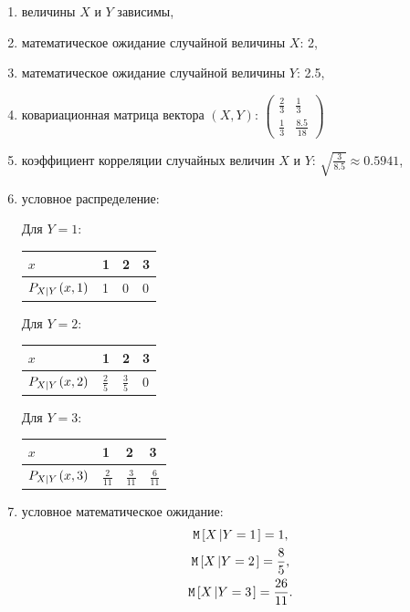 \begin{enumerate}
    \item величины $X$ и $Y$ зависимы,
    \item математическое ожидание случайной величины $X$: 2,
    \item математическое ожидание случайной величины $Y$: 2.5,
    \item ковариационная матрица вектора $\left ( X, Y \right )$:
    $
    \begin{pmatrix}
        \frac{2}{3} & \frac{1}{3}    \\
        \frac{1}{3} & \frac{8.5}{18}
    \end{pmatrix}
    $

    \item коэффициент корреляции случайных величин $X$ и $Y$: $\sqrt{\frac{3}{8.5}} \approx 0.5941$,
    \item условное распределение:

    Для $Y=1$:

    \begin{tabular}{|p{3cm}|p{1cm}|p{1cm}|p{1cm}|}
        \hline
        $x$                          & 1 & 2 & 3 \\
        \hline
        $P_{X \left | Y \right .}(x, 1)$ & 1 & 0 & 0 \\
        \hline
    \end{tabular}

    Для $Y=2$:

    \begin{tabular}{|p{3cm}|p{1cm}|p{1cm}|p{1cm}|}
        \hline
        $x$                          & 1             & 2             & 3 \\
        \hline
        $P_{X \left | Y \right .}(x, 2)$ & $\frac{2}{5}$ & $\frac{3}{5}$ & 0 \\
        \hline
    \end{tabular}

    Для $Y=3$:

    \begin{tabular}{|p{3cm}|p{1cm}|p{1cm}|p{1cm}|}
        \hline
        $x$                          & 1              & 2              & 3              \\
        \hline
        $P_{X \left | Y \right .}(x, 3)$ & $\frac{2}{11}$ & $\frac{3}{11}$ & $\frac{6}{11}$ \\
        \hline
    \end{tabular}

    \item условное математическое ожидание:
    \begin{gather*}
        \mathtt{M} \left [ X \left | Y=1 \right . \right ] = 1 , \\
        \mathtt{M} \left [ X \left | Y=2 \right . \right ] = \frac{8}{5} , \\
        \mathtt{M} \left [ X \left | Y=3 \right . \right ] = \frac{26}{11} .
    \end{gather*}
\end{enumerate}


